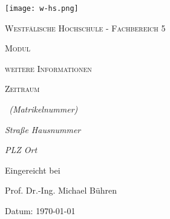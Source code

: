 
\begin{titlepage}

\centering
\texttt{[image: w-hs.png]}
\par\vspace{1.5cm}
{\scshape\Large Westfälische Hochschule - Fachbereich 5\par}
\vspace{1cm}
{\scshape\Large Modul\par}
{\scshape\normalsize weitere Informationen\par}
{\scshape\small Zeitraum\par}
\vspace{2cm}
{\Large\textbf{\titlename}\par}
\vspace{2cm}
{\Large\itshape \authorname~(Matrikelnummer)\par}
{\large\itshape Straße Hausnummer \par}
{\large\itshape PLZ Ort\par}
\vfill
{Eingereicht bei\par
Prof. Dr.-Ing. Michael Bühren\par}
\vfill
{\large Datum: \today\par}

\end{titlepage}
